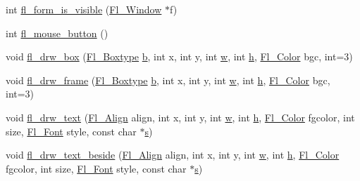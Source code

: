 \begin{DoxyCompactItemize}
int \hyperlink{forms_8_h_ace77610224c452068056950d686df7b2}{fl\+\_\+form\+\_\+is\+\_\+visible} (\hyperlink{class_fl___window}{Fl\+\_\+\+Window} $\ast$f)
\item 
int \hyperlink{forms_8_h_af246c9c93ccb649c375c1796fc7c0d8c}{fl\+\_\+mouse\+\_\+button} ()
\item 
void \hyperlink{forms_8_h_aa88143f227461d198aab73d126b9c951}{fl\+\_\+drw\+\_\+box} (\hyperlink{_enumerations_8_h_ae48bf9070f8541de17829f54ccacc6bc}{Fl\+\_\+\+Boxtype} \hyperlink{forms_8_h_a0ba06a290a384fa06b1b90745827dae2}{b}, int x, int y, int \hyperlink{forms_8_h_aac374e320caaadeca4874add33b62af2}{w}, int \hyperlink{forms_8_h_a7e427ba5b307f9068129699250690066}{h}, \hyperlink{_enumerations_8_h_a8b762953646f8abee866061f1af78a6a}{Fl\+\_\+\+Color} bgc, int=3)
\item 
void \hyperlink{forms_8_h_a370cc6166bbddeae7546604a21a2b06b}{fl\+\_\+drw\+\_\+frame} (\hyperlink{_enumerations_8_h_ae48bf9070f8541de17829f54ccacc6bc}{Fl\+\_\+\+Boxtype} \hyperlink{forms_8_h_a0ba06a290a384fa06b1b90745827dae2}{b}, int x, int y, int \hyperlink{forms_8_h_aac374e320caaadeca4874add33b62af2}{w}, int \hyperlink{forms_8_h_a7e427ba5b307f9068129699250690066}{h}, \hyperlink{_enumerations_8_h_a8b762953646f8abee866061f1af78a6a}{Fl\+\_\+\+Color} bgc, int=3)
\item 
void \hyperlink{forms_8_h_a9e04f90932f0e52f138bad3d7d3a1df1}{fl\+\_\+drw\+\_\+text} (\hyperlink{_enumerations_8_h_a44e8bcd1e030e65e4f88cbae64a7c3e3}{Fl\+\_\+\+Align} align, int x, int y, int \hyperlink{forms_8_h_aac374e320caaadeca4874add33b62af2}{w}, int \hyperlink{forms_8_h_a7e427ba5b307f9068129699250690066}{h}, \hyperlink{_enumerations_8_h_a8b762953646f8abee866061f1af78a6a}{Fl\+\_\+\+Color} fgcolor, int size, \hyperlink{_enumerations_8_h_a2ac46d9f082834b969fffe490a03a709}{Fl\+\_\+\+Font} style, const char $\ast$\hyperlink{forms_8_h_a672b4f0a8c8a6db61068c721f799d87f}{s})
\item 
void \hyperlink{forms_8_h_a313c7b108223d9452fd5f6d4b0b70965}{fl\+\_\+drw\+\_\+text\+\_\+beside} (\hyperlink{_enumerations_8_h_a44e8bcd1e030e65e4f88cbae64a7c3e3}{Fl\+\_\+\+Align} align, int x, int y, int \hyperlink{forms_8_h_aac374e320caaadeca4874add33b62af2}{w}, int \hyperlink{forms_8_h_a7e427ba5b307f9068129699250690066}{h}, \hyperlink{_enumerations_8_h_a8b762953646f8abee866061f1af78a6a}{Fl\+\_\+\+Color} fgcolor, int size, \hyperlink{_enumerations_8_h_a2ac46d9f082834b969fffe490a03a709}{Fl\+\_\+\+Font} style, const char $\ast$\hyperlink{forms_8_h_a672b4f0a8c8a6db61068c721f799d87f}{s})
\item 

\end{DoxyCompactItemize}
